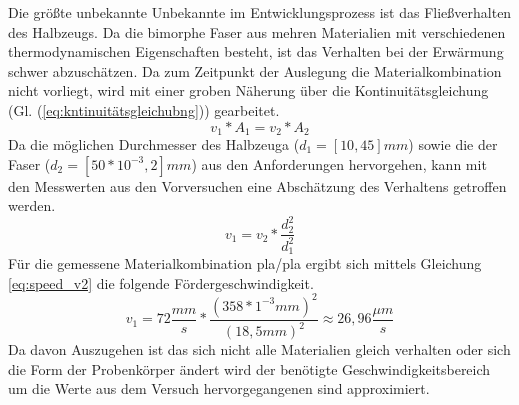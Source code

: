 \vspace{20mm}
 
Die größte unbekannte Unbekannte im Entwicklungsprozess ist das Fließverhalten des Halbzeugs. Da die bimorphe Faser aus mehren Materialien mit verschiedenen thermodynamischen Eigenschaften besteht, ist das Verhalten bei der Erwärmung schwer abzuschätzen. Da zum Zeitpunkt der Auslegung die Materialkombination nicht vorliegt, wird mit einer groben Näherung über die Kontinuitätsgleichung (Gl. (\ref{eq:kntinuitätsgleichubng})) gearbeitet.
\begin{equation}\label{eq:kntinuitätsgleichubng}
    v_1*A_1 = v_2*A_2
\end{equation}
Da die möglichen Durchmesser des Halbzeuga ($d_1 = [10, 45]mm$) sowie die  der  Faser ($ d_2 = [50*10^{-3}, 2]mm$) aus den Anforderungen hervorgehen, kann mit den Messwerten aus den Vorversuchen eine Abschätzung des Verhaltens getroffen werden.
\begin{equation}\label{eq:speed_v2}
    v_1 = v_2 * \frac{d_2^2}{d_1^2}
\end{equation}
Für die gemessene Materialkombination \acs{pla}/\acs{pla} ergibt sich mittels Gleichung \ref{eq:speed_v2} die folgende Fördergeschwindigkeit.
\begin{equation*}
    v_1 = 72\frac{mm}{s}*\frac{(358 * 1^{-3}mm)^2}{(18,5mm)^2} \approx 26,96 \frac{\mu m}{s}
\end{equation*}
Da davon Auszugehen ist das sich nicht alle Materialien gleich verhalten oder sich die Form der Probenkörper ändert wird der benötigte Geschwindigkeitsbereich um die Werte aus dem Versuch hervorgegangenen sind approximiert. 

